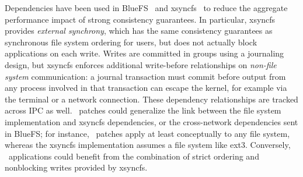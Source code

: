 Dependencies have been used in
BlueFS~\cite{nightingale05speculative} and
xsyncfs~\cite{nightingale06rethink} to reduce the aggregate performance
impact of strong consistency guarantees.
%
In particular, xsyncfs provides \emph{external synchrony}, which
has the same consistency guarantees as synchronous file system ordering for
users, but does not actually block applications on each write.
%
Writes are committed in groups using a journaling design, but
%
xsyncfs enforces additional write-before relationships on
\emph{non-file system} communication: a journal transaction must commit
before output from any process involved in that transaction can
escape the kernel, for example via the terminal or a network connection.
%
These dependency relationships are tracked across IPC as well.
%
\Featherstitch\ patches could generalize the link between the file system
implementation and xsyncfs dependencies, or the cross-network dependencies
sent in BlueFS; for instance, \Kudos\ patches apply at least conceptually
to any file system, whereas the xsyncfs implementation assumes a file
system like ext3.
%
Conversely, \Featherstitch\ applications could benefit from the
combination of strict ordering and nonblocking writes provided by xsyncfs.

\begin{comment}
written by that transaction, \emph{or} any
data written by processes involved in that transaction's writes after that
trasactions data that might have been computed by a process that wrote
anything in that process.
%
depending on any write in
the assuming that commit

but the system
tracks any process output that followed---and, thus, might depend
on---these writes.
%
Any user-visible operation

the b operations are combined and com a journal, but a dependency subsystem
tracks

External synchrony~\cite{nightingale06rethink} builds on journaling to
automatically provide strict file system operation ordering for applications,
without requiring them to block on each write. It combines operations into a
journal, but tracks the activity of the calling processes after returning
control to them from the file system. If a process later performs some
\emph{user-visible} operation like printing text to the screen or sending
network traffic, the journal transaction containing the changes is forced to
commit before the process can continue.
%
External synchrony depends inherently on dependency tracking; dependencies
among processes with outstanding data are tracked to ensure that
uncommitted output never reaches a user. However, it also depends on a
particular file system consistency methodology, namely journaling, and it
is implemented only in an ext3-like file system called xsyncfs. \Kudos\
\patch\ dependencies could be a natural implementation strategy for its
dependencies, allowing them to apply to any file system.
%
Similar \patch-like dependencies are used to improve network file system
performance in BlueFS~\cite{nightingale05speculative}.
\end{comment}

